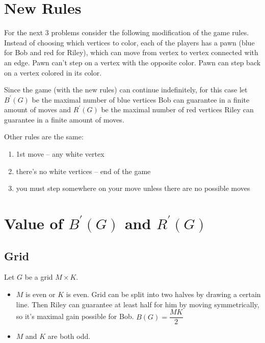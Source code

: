 \documentclass[12pt,a4paper, flushleft]{article}
\newcommand{\p}[1]{#1^{\prime}}
\begin{document}
\section{}
\section*{New Rules}
For the next 3 problems consider the following modification of the game rules. Instead of
choosing which vertices to color, each of the players has a pawn (blue for Bob and red for Riley),
which can move from vertex to vertex connected with an edge. Pawn can't step on a vertex with the opposite color. Pawn can step back on a vertex colored in its color.

Since the game (with the new rules) can continue indefinitely, for this case let $\p B (G)$ be the
maximal number of blue vertices Bob can guarantee in a finite amount of moves and $\p R (G)$ be
the maximal number of red vertices Riley can guarantee in a finite amount of moves.

Other rules are the same:
\begin{enumerate}
	\item 1st move -- any white vertex
	\item there's no white vertices -- end of the game
	\item you must step somewhere on your move unless there are no possible moves
\end{enumerate}	
\section{Value of $\p B(G) $ and $\p R(G)$}
\subsection{Grid}
Let $G$ be a grid $M\times K$.

\begin{itemize}
	\item $M$ is even or $K$ is even. Grid can be split into two halves by drawing a certain line. Then Riley can guarantee at least half for him by moving symmetrically, so it's maximal gain possible for Bob. $B(G) = \dfrac{MK}{2}$
	\item $M$ and $K$ are both odd.
\end{itemize}
\end{document}

